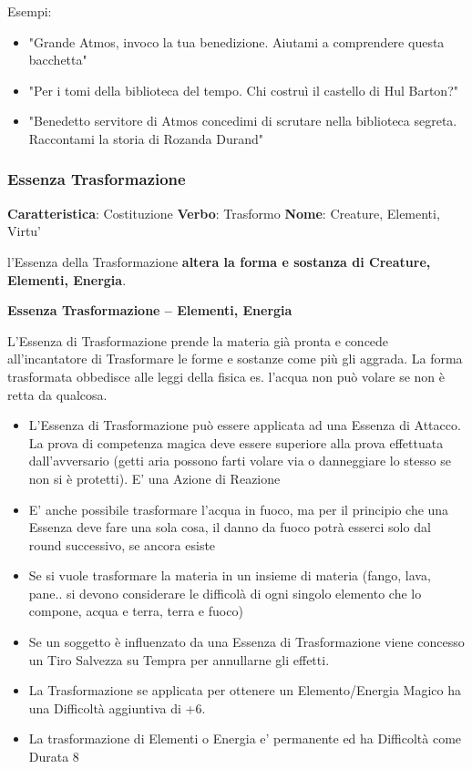 \documentclass[a4paper,10 pt,twoside,openany]{book}
\begin{document}
\bigskip

Esempi:
\begin{itemize}
	\item
	"Grande Atmos, invoco la tua benedizione. Aiutami a comprendere questa bacchetta"
	\item
	"Per i tomi della biblioteca del tempo. Chi costruì il castello di Hul Barton?"
	\item
	"Benedetto servitore di Atmos concedimi di scrutare nella biblioteca segreta. Raccontami la storia di Rozanda Durand"
\end{itemize}
\pagebreak


\subsubsection{Essenza Trasformazione}

\textbf{Caratteristica}: Costituzione
\textbf{Verbo}: Trasformo
\textbf{Nome}: Creature, Elementi, Virtu'

\label{essenza-trasformazione---potenza}

l'Essenza della Trasformazione \textbf{altera la forma e sostanza di Creature, Elementi, Energia}.

\bigskip

\textbf{Essenza Trasformazione -- Elementi, Energia}

L'Essenza di Trasformazione prende la materia già pronta e concede all'incantatore di Trasformare le forme e sostanze come più gli aggrada. La forma trasformata obbedisce alle leggi della fisica es. l'acqua non può volare se non è retta da qualcosa.

\begin{itemize}
	\item
	L'Essenza di Trasformazione può essere applicata ad una Essenza di Attacco. La prova di competenza magica deve essere superiore alla prova effettuata dall'avversario (getti aria possono farti volare via o danneggiare lo stesso se non si è protetti). E' una Azione di Reazione
	\item
	E' anche possibile trasformare l'acqua in fuoco, ma per il principio che una Essenza deve fare una sola cosa, il danno da fuoco potrà esserci solo dal round successivo, se ancora esiste
	\item
	Se si vuole trasformare la materia in un insieme di materia (fango, lava, pane.. si devono considerare le difficolà di ogni singolo elemento che lo compone, acqua e terra, terra e fuoco)
	\item
	Se un soggetto è influenzato da una Essenza di Trasformazione viene concesso un Tiro Salvezza su Tempra per annullarne gli effetti.
	\item
	La Trasformazione se applicata per ottenere un Elemento/Energia Magico ha una Difficoltà aggiuntiva di +6.
	\item
	La trasformazione di Elementi o Energia e' permanente ed ha Difficoltà come Durata 8

\end{itemize}
\end{document}
